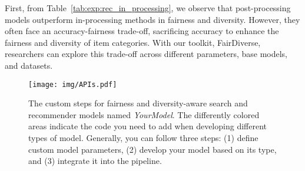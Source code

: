 First, from Table~\ref{tab:exp:rec_in_processing}, we observe that post-processing models outperform in-processing methods in fairness and diversity. However, they often face an accuracy-fairness trade-off, sacrificing accuracy to enhance the fairness and diversity of item categories. With our toolkit, FairDiverse, researchers can explore this trade-off across different parameters, base models, and datasets.



\begin{figure*}[t]  
    \centering    
    \texttt{[image: img/APIs.pdf]}
    \caption{The custom steps for fairness and diversity-aware search and recommender models named \textit{YourModel}. The differently colored areas indicate the code you need to add when developing  different types of model. Generally, you can follow three steps: (1) define custom model parameters, (2) develop your model based on its type, and (3) integrate it into the pipeline. }
    \label{fig:rec_APIs}
\end{figure*}



